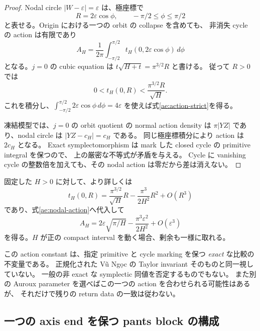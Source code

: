 \begin{proof}
Nodal circle $|W-\varepsilon|=\varepsilon$ は、極座標で
\[
 R=2\varepsilon\cos\phi,\qquad -\pi/2\le\phi\le\pi/2
\]
と表せる。Origin における一つの orbit の collapse を含めても、
非消失 cycle の action は有限であり
\begin{equation}\label{ae:nodal-action}
 A_H=\frac1{2\pi}\int_{-\pi/2}^{\pi/2}
 t_H(0,2\varepsilon\cos\phi)\,d\phi
\end{equation}
となる。$j=0$ の cubic equation は
$t\sqrt{H+t}=\pi^{3/2}R$ と書ける。
従って $R>0$ では
\[
 0<t_H(0,R)<\frac{\pi^{3/2}R}{\sqrt H}.
\]
これを積分し、$\int_{-\pi/2}^{\pi/2}2\varepsilon\cos\phi\,d\phi=4\varepsilon$
を使えば式\eqref{ae:action-strict}を得る。

凍結模型では、$j=0$ の orbit quotient の normal action density は
$\pi|YZ|$ であり、nodal circle は $|YZ-c_H|=c_H$ である。
同じ極座標積分により action は $2c_H$ となる。
Exact symplectomorphism は mark した closed cycle の primitive integral を保つので、
上の厳密な不等式が矛盾を与える。
Cycle に vanishing cycle の整数倍を加えても、その nodal action は零だから差は消えない。
\end{proof}

固定した $H>0$ に対して、より詳しくは
\[
 t_H(0,R)=\frac{\pi^{3/2}}{\sqrt H}R
 -\frac{\pi^3}{2H^2}R^2+O(R^3)
\]
であり、式\eqref{ae:nodal-action}へ代入して
\begin{equation}\label{ae:action-expansion}
 A_H=2\varepsilon\sqrt{\pi/H}
 -\frac{\pi^3\varepsilon^2}{2H^2}+O(\varepsilon^3)
\end{equation}
を得る。$H$ が正の compact interval を動く場合、剰余も一様に取れる。

\begin{remark}\label{ae:obstruction-scope}
この action constant は、指定 primitive と cycle marking を保つ
\emph{exact} な比較の不変量である。
正規化された V\~u Ng\d{o}c の Taylor invariant そのものと同一視していない。
一般の非 exact な symplectic 同値を否定するものでもない。
また別の Auroux parameter を選べばこの一つの action を合わせられる可能性はあるが、
それだけで残りの return data の一致は従わない。
\end{remark}

\subsection{一つの axis end を保つ pants block の構成}


